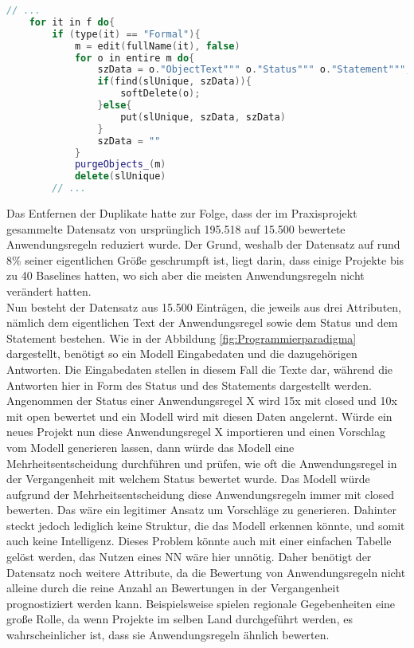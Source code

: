 \begin{lstlisting}[language = C++, caption={Duplikate in Modulen löschen},captionpos=b, label = lst:deleteDuplicates, float, floatplacement=H]
    // ...
    for it in f do{
        if (type(it) == "Formal"){
            m = edit(fullName(it), false)
            for o in entire m do{
                szData = o."ObjectText""" o."Status""" o."Statement""";
                if(find(slUnique, szData)){
                    softDelete(o);
                }else{
                    put(slUnique, szData, szData)
                }
                szData = "" 
            }
            purgeObjects_(m)
            delete(slUnique)
        // ...
\end{lstlisting}

Das Entfernen der Duplikate hatte zur Folge, dass der im Praxisprojekt gesammelte Datensatz von ursprünglich 195.518 auf 15.500 bewertete Anwendungsregeln reduziert wurde.
Der Grund, weshalb der Datensatz auf rund 8\% seiner eigentlichen Größe geschrumpft ist, liegt darin, dass einige Projekte bis zu 40 Baselines hatten, 
wo sich aber die meisten Anwendungsregeln nicht verändert hatten. \\

Nun besteht der Datensatz aus 15.500 Einträgen, die jeweils aus drei Attributen, nämlich dem eigentlichen Text der Anwendungsregel sowie dem Status und dem Statement bestehen.
Wie in der Abbildung \ref{fig:Programmierparadigma} dargestellt, benötigt so ein Modell Eingabedaten und die dazugehörigen Antworten. Die Eingabedaten stellen in diesem Fall
die Texte dar, während die Antworten hier in Form des Status und des Statements dargestellt werden. Angenommen der Status einer Anwendungsregel X wird 15x mit closed
und 10x mit open bewertet und ein Modell wird mit diesen Daten angelernt. Würde ein neues Projekt nun diese Anwendungsregel X importieren und einen Vorschlag vom Modell
generieren lassen, dann würde das Modell eine Mehrheitsentscheidung durchführen und prüfen, wie oft die Anwendungsregel in der Vergangenheit mit welchem Status bewertet wurde.
Das Modell würde aufgrund der Mehrheitsentscheidung diese Anwendungsregeln immer mit closed bewerten. Das wäre ein legitimer Ansatz um Vorschläge zu generieren. 
Dahinter steckt jedoch lediglich keine Struktur, die das Modell erkennen könnte, und somit auch keine Intelligenz. Dieses Problem könnte auch mit einer einfachen Tabelle 
gelöst werden, das Nutzen eines \ac{NN} wäre hier unnötig. Daher benötigt der Datensatz noch weitere Attribute, da die Bewertung von Anwendungsregeln nicht alleine durch die 
reine Anzahl an Bewertungen in der Vergangenheit prognostiziert werden kann. Beispielsweise spielen regionale Gegebenheiten eine große Rolle, 
da wenn Projekte im selben Land durchgeführt werden, es wahrscheinlicher ist, dass sie Anwendungsregeln ähnlich bewerten. 

